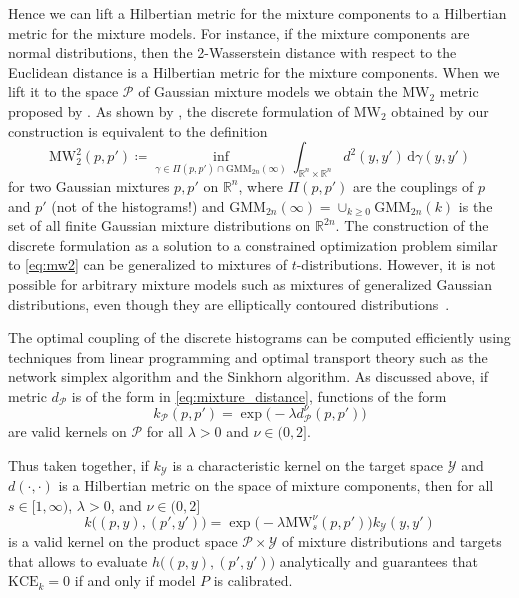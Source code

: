 \documentclass{article}
\begin{document}
Hence we can lift a Hilbertian metric for the mixture components to a Hilbertian
metric for the mixture models. For instance, if the mixture components are normal
distributions, then the 2-Wasserstein distance with respect to the Euclidean distance is
a Hilbertian metric for the mixture components. When we lift it to the space $\mathcal{P}$
of Gaussian mixture models we obtain the $\mathrm{MW}_2$ metric proposed by
\citet{Delon2019,Chen2019,Chen2020}. As shown by \citet{Delon2019},
the discrete formulation of $\mathrm{MW}_2$ obtained by our construction is
equivalent to the definition
\begin{equation}\label{eq:mw2}
    \mathrm{MW}^2_2(p, p') \coloneqq \inf_{\gamma \in \Pi(p, p') \cap \mathrm{GMM}_{2n}(\infty)}
    \int_{\mathbb{R}^n \times \mathbb{R}^n} d^2(y, y') \,\mathrm{d}\gamma(y,y')
\end{equation}
for two Gaussian mixtures $p, p'$ on $\mathbb{R}^n$, where $\Pi(p, p')$ are the
couplings of $p$ and $p'$ (not of the histograms!) and $\mathrm{GMM}_{2n}(\infty) =
\cup_{k \geq 0} \mathrm{GMM}_{2n}(k)$ is the set of all finite Gaussian mixture distributions
on $\mathbb{R}^{2n}$. The construction of the discrete formulation as a solution to
a constrained optimization problem similar to \cref{eq:mw2} can be generalized to
mixtures of $t$-distributions. However, it is not possible for arbitrary mixture models
such as mixtures of generalized Gaussian distributions, even though they are
elliptically contoured distributions~\citep{Deledalle2018,Delon2019}.

The optimal coupling of the discrete histograms
can be computed efficiently using techniques from linear programming and optimal
transport theory such as the network simplex algorithm and the Sinkhorn algorithm.
As discussed above, if metric $d_{\mathcal{P}}$ is of the form in
\cref{eq:mixture_distance}, functions of the form
\begin{equation*}
    k_{\mathcal{P}}(p, p') = \exp{\big(- \lambda d^\nu_{\mathcal{P}}(p, p')\big)}
\end{equation*}
are valid kernels on $\mathcal{P}$ for all $\lambda > 0$ and $\nu \in (0, 2]$.

Thus taken together, if $k_{\mathcal{Y}}$ is a characteristic kernel on the
target space $\mathcal{Y}$ and $d(\cdot, \cdot)$ is a Hilbertian
metric on the space of mixture components, then for all $s \in [1, \infty)$, $\lambda > 0$,
and $\nu \in (0, 2]$
\begin{equation*}
    k\big((p, y), (p', y')\big) = \exp{\big(-\lambda \mathrm{MW}_s^\nu(p, p')\big)} k_{\mathcal{Y}}(y, y')
\end{equation*}
is a valid kernel on the product space $\mathcal{P} \times \mathcal{Y}$
of mixture distributions and targets that allows to evaluate $h\big((p, y), (p', y')\big)$
analytically and guarantees that $\mathrm{KCE}_k = 0$ if and only if
model $P$ is calibrated.
\end{document}
